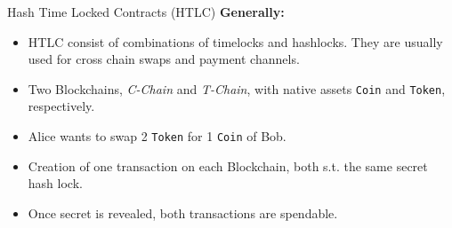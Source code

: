 \documentclass[handout]{beamer}
\begin{document}
\begin{frame}{Hash Time Locked Contracts (HTLC)}
	\textbf{Generally:}
	\begin{itemize}
		\item<1 -> HTLC consist of combinations of timelocks and hashlocks. They are usually used for cross chain swaps and payment channels.
	\end{itemize}
	\vspace{0.5cm}
	\begin{itemize}
		\item<2 -> Two Blockchains, \textit{C-Chain} and \textit{T-Chain}, with native assets \texttt{Coin} and \texttt{Token}, respectively. 
		\item<3 -> Alice wants to swap 2 \texttt{Token} for 1 \texttt{Coin} of Bob.
		\item<4 -> Creation of one transaction on each Blockchain, both s.t. the same secret hash lock.
		\item<5 -> Once secret is revealed, both transactions are spendable.
	\end{itemize}
\end{frame}

\end{document}
